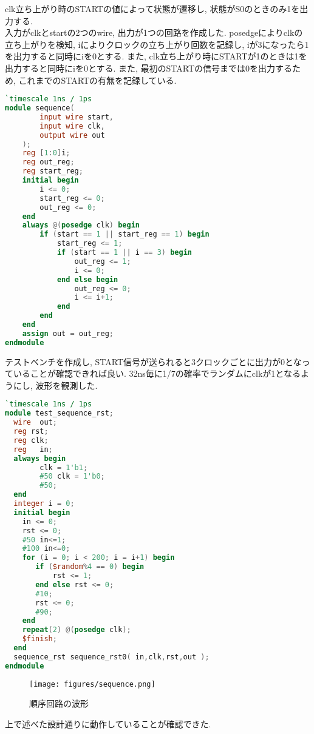 \documentclass[titlepage]{ltjsarticle}
\begin{document}
clk立ち上がり時のSTARTの値によって状態が遷移し, 状態がS0のときのみ1を出力する. \\
入力がclkとstartの2つのwire, 出力が1つの回路を作成した. posedgeによりclkの立ち上がりを検知, iによりクロックの立ち上がり回数を記録し, iが3になったら1を出力すると同時にiを0とする. また, clk立ち上がり時にSTARTが1のときは1を出力すると同時にiを0とする. また, 最初のSTARTの信号までは0を出力するため, これまでのSTARTの有無を記録している. 
\begin{lstlisting}[caption=順序回路デザイン,language=verilog]
`timescale 1ns / 1ps
module sequence(
        input wire start,
        input wire clk,
        output wire out
    );
    reg [1:0]i;
    reg out_reg;
    reg start_reg;
    initial begin
        i <= 0;
        start_reg <= 0;
        out_reg <= 0;
    end
    always @(posedge clk) begin
        if (start == 1 || start_reg == 1) begin
            start_reg <= 1;
            if (start == 1 || i == 3) begin 
                out_reg <= 1;
                i <= 0;
            end else begin
                out_reg <= 0;
                i <= i+1;
            end
        end
    end
    assign out = out_reg;
endmodule
\end{lstlisting}
テストベンチを作成し, START信号が送られると3クロックごとに出力が0となっていることが確認できれば良い. 32ns毎に1/7の確率でランダムにclkが1となるようにし, 波形を観測した. 
\begin{lstlisting}[caption=順序回路テストベンチ,language=verilog]
`timescale 1ns / 1ps
module test_sequence_rst;
  wire	out;
  reg rst;
  reg clk;
  reg	in;
  always begin
        clk = 1'b1;
        #50 clk = 1'b0;
        #50;
  end
  integer i = 0;
  initial begin
	in <= 0;
	rst <= 0;
	#50 in<=1;
	#100 in<=0;
	for (i = 0; i < 200; i = i+1) begin
	   if ($random%4 == 0) begin
	       rst <= 1;
	   end else rst <= 0;
	   #10;
	   rst <= 0;
	   #90;
	end
	repeat(2) @(posedge clk);
	$finish;
  end
  sequence_rst sequence_rst0( in,clk,rst,out );
endmodule
\end{lstlisting}
\begin{figure}[H]
    \begin{center}
        \texttt{[image: figures/sequence.png]}
        \caption{順序回路の波形}
    \end{center}
\end{figure}
上で述べた設計通りに動作していることが確認できた. 
\end{document}

